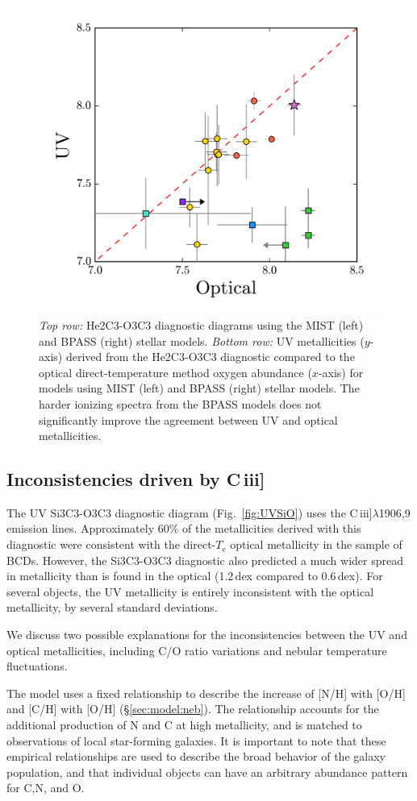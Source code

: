 \documentclass[preprint2]{aastex62}
\newcommand{\ciii}{C\,{\sc iii}]\xspace}
\newcommand{\Te}{\ensuremath{T_{\mathrm{e}}}\xspace}
\begin{document}
\begin{figure}
\begin{center}
    \includegraphics[width=0.45\linewidth]{figs/f10d.png}
    \caption{\emph{Top row:} He2C3-O3C3 diagnostic diagrams using the MIST (left) and BPASS (right) stellar models. \emph{Bottom row:} UV metallicities ($y$-axis) derived from the He2C3-O3C3 diagnostic compared to the optical direct-temperature method oxygen abundance ($x$-axis) for models using MIST (left) and BPASS (right) stellar models. The harder ionizing spectra from the BPASS models does not significantly improve the agreement between UV and optical metallicities.}
    \label{fig:BPASS}
  \end{center}
\end{figure}

\subsection{Inconsistencies driven by \ciii}

The UV Si3C3-O3C3 diagnostic diagram (Fig.~\ref{fig:UVSiO}) uses the \ciii$\lambda$1906,9 emission lines. Approximately 60\% of the metallicities derived with this diagnostic were consistent with the direct-\Te optical metallicity in the \citet{Berg+2016} sample of BCDs. However, the Si3C3-O3C3 diagnostic also predicted a much wider spread in metallicity than is found in the optical (1.2\,dex compared to 0.6\,dex). For several objects, the UV metallicity is entirely inconsistent with the optical metallicity, by several standard deviations.

We discuss two possible explanations for the inconsistencies between the UV and optical metallicities, including C/O ratio variations and nebular temperature fluctuations.

The \citet{Byler+2018} model uses a fixed relationship to describe the increase of [N/H] with [O/H] and [C/H] with [O/H] (\S\ref{sec:model:neb}). The relationship accounts for the additional production of N and C at high metallicity, and is matched to observations of local star-forming galaxies. It is important to note that these empirical relationships are used to describe the broad behavior of the galaxy population, and that individual objects can have an arbitrary abundance pattern for C,N, and O.
\end{document}
